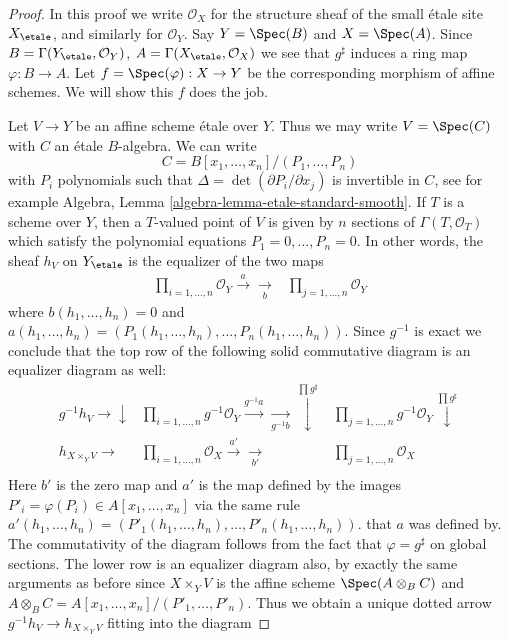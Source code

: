 \begin{proof}
In this proof we write $\mathcal{O}_X$ for the structure sheaf
of the small \'etale site $X_\etale$, and similarly for
$\mathcal{O}_Y$. Say $Y = \Spec(B)$ and $X = \Spec(A)$. Since
$B = \Gamma(Y_\etale, \mathcal{O}_Y)$,
$A = \Gamma(X_\etale, \mathcal{O}_X)$
we see that $g^\sharp$ induces a ring map $\varphi : B \to A$.
Let $f = \Spec(\varphi) : X \to Y$ be the corresponding morphism
of affine schemes. We will show this $f$ does the job.

\medskip\noindent
Let $V \to Y$ be an affine scheme \'etale over $Y$. Thus we may write
$V = \Spec(C)$ with $C$ an \'etale $B$-algebra. We can write
$$
C = B[x_1, \ldots, x_n]/(P_1, \ldots, P_n)
$$
with $P_i$ polynomials such that $\Delta = \det(\partial P_i/ \partial x_j)$
is invertible in $C$, see for example
Algebra, Lemma \ref{algebra-lemma-etale-standard-smooth}.
If $T$ is a scheme over $Y$, then a $T$-valued point of $V$ is given by
$n$ sections of $\Gamma(T, \mathcal{O}_T)$ which satisfy the polynomial
equations $P_1 = 0, \ldots, P_n = 0$. In other words, the sheaf $h_V$
on $Y_\etale$ is the equalizer of the two maps
$$
\begin{array}{cc}\prod\nolimits_{i = 1, \ldots, n} \mathcal{O}_Y
\overset{a}{\longrightarrow}\underset{b}{\longrightarrow} & \prod\nolimits_{j = 1, \ldots, n} \mathcal{O}_Y\end{array}
$$
where $b(h_1, \ldots, h_n) = 0$ and
$a(h_1, \ldots, h_n) =
(P_1(h_1, \ldots, h_n), \ldots, P_n(h_1, \ldots, h_n))$.
Since $g^{-1}$ is exact we conclude that the top row of the
following solid commutative diagram is an equalizer diagram as well:
$$
\begin{array}{ccc}g^{-1}h_V \longrightarrow\downarrow & \prod\nolimits_{i = 1, \ldots, n} g^{-1}\mathcal{O}_Y
\overset{g^{-1}a}{\longrightarrow}\underset{g^{-1}b}{\longrightarrow}\overset{\prod g^\sharp}{\downarrow} & \prod\nolimits_{j = 1, \ldots, n} g^{-1}\mathcal{O}_Y \overset{\prod g^\sharp}{\downarrow} \\ h_{X \times_Y V} \longrightarrow & \prod\nolimits_{i = 1, \ldots, n} \mathcal{O}_X
\overset{a'}{\longrightarrow}\underset{b'}{\longrightarrow} & \prod\nolimits_{j = 1, \ldots, n} \mathcal{O}_X \\  &  & \end{array}
$$
Here $b'$ is the zero map and $a'$ is the map defined by the
images $P'_i = \varphi(P_i) \in A[x_1, \ldots, x_n]$ via the same
rule
$a'(h_1, \ldots, h_n) =
(P'_1(h_1, \ldots, h_n), \ldots, P'_n(h_1, \ldots, h_n))$.
that $a$ was defined by. The commutativity of the diagram follows from
the fact that $\varphi = g^\sharp$ on global sections. The lower
row is an equalizer diagram also, by exactly the same arguments as
before since $X \times_Y V$ is the affine scheme
$\Spec(A \otimes_B C)$ and
$A \otimes_B C = A[x_1, \ldots, x_n]/(P'_1, \ldots, P'_n)$.
Thus we obtain a unique dotted arrow
$g^{-1}h_V \to h_{X \times_Y V}$ fitting into the diagram


\end{proof}
